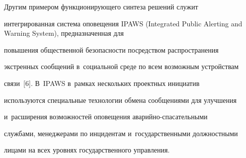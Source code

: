   


  Другим примером функционирующего синтеза решений служит 


интегрированная сис\-те\-ма оповещения IPAWS (Integrated Public Alerting and Warning System), предназначенная для 


повышения общественной безопас\-ности по\-сред\-ст\-вом распространения 


экстренных сообщений в~социальной среде по всем воз\-мож\-ным устройствам 


связи~[6]. В~IPAWS в~рамках нескольких проектных инициатив 


используются специальные технологии обмена сообщениями для улуч\-ше\-ния 


и~расширения возможностей оповещения ава\-рий\-но-спа\-са\-тель\-ны\-ми 


службами, менеджерами по инцидентам и~государственными должностными 


лицами на всех уровнях государственного управ\-ле\-ния. 





